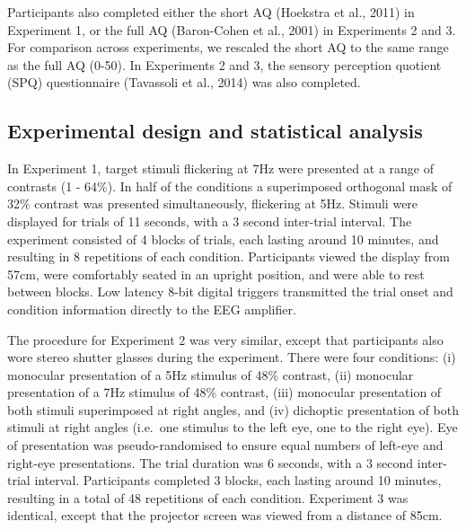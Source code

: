 \documentclass[
]{article}
\begin{document}
Participants also completed either the short AQ (Hoekstra et al., 2011) in Experiment 1, or the full AQ (Baron-Cohen et al., 2001) in Experiments 2 and 3. For comparison across experiments, we rescaled the short AQ to the same range as the full AQ (0-50). In Experiments 2 and 3, the sensory perception quotient (SPQ) questionnaire (Tavassoli et al., 2014) was also completed.

\hypertarget{experimental-design-and-statistical-analysis}{%
\subsection{Experimental design and statistical analysis}\label{experimental-design-and-statistical-analysis}}

In Experiment 1, target stimuli flickering at 7Hz were presented at a range of contrasts (1 - 64\%). In half of the conditions a superimposed orthogonal mask of 32\% contrast was presented simultaneously, flickering at 5Hz. Stimuli were displayed for trials of 11 seconds, with a 3 second inter-trial interval. The experiment consisted of 4 blocks of trials, each lasting around 10 minutes, and resulting in 8 repetitions of each condition. Participants viewed the display from 57cm, were comfortably seated in an upright position, and were able to rest between blocks. Low latency 8-bit digital triggers transmitted the trial onset and condition information directly to the EEG amplifier.

The procedure for Experiment 2 was very similar, except that participants also wore stereo shutter glasses during the experiment. There were four conditions: (i) monocular presentation of a 5Hz stimulus of 48\% contrast, (ii) monocular presentation of a 7Hz stimulus of 48\% contrast, (iii) monocular presentation of both stimuli superimposed at right angles, and (iv) dichoptic presentation of both stimuli at right angles (i.e.~one stimulus to the left eye, one to the right eye). Eye of presentation was pseudo-randomised to ensure equal numbers of left-eye and right-eye presentations. The trial duration was 6 seconds, with a 3 second inter-trial interval. Participants completed 3 blocks, each lasting around 10 minutes, resulting in a total of 48 repetitions of each condition. Experiment 3 was identical, except that the projector screen was viewed from a distance of 85cm.
\end{document}
